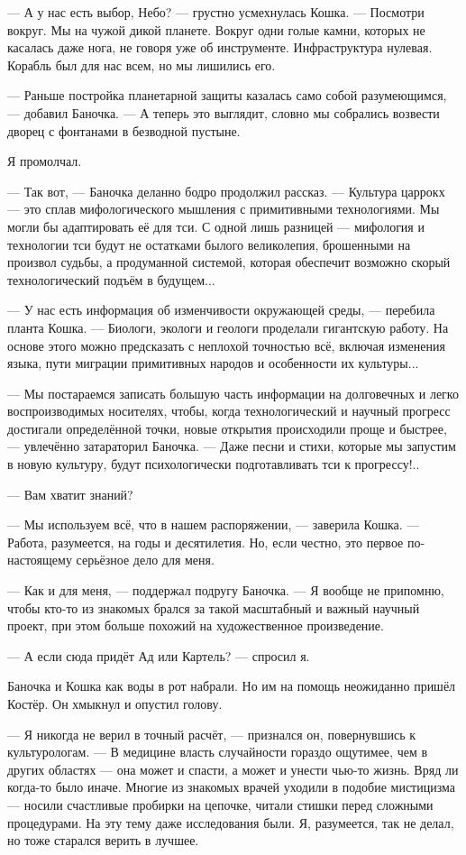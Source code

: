 --- А у нас есть выбор, Небо? --- грустно усмехнулась Кошка.
--- Посмотри вокруг.
Мы на чужой дикой планете.
Вокруг одни голые камни, которых не касалась даже нога, не говоря уже об инструменте.
Инфраструктура нулевая.
Корабль был для нас всем, но мы лишились его.

--- Раньше постройка планетарной защиты казалась само собой разумеющимся, --- добавил Баночка.
--- А теперь это выглядит, словно мы собрались возвести дворец с фонтанами в безводной пустыне.

Я промолчал.

--- Так вот, --- Баночка деланно бодро продолжил рассказ.
--- Культура царрокх --- это сплав мифологического мышления с примитивными технологиями.
Мы могли бы адаптировать её для тси.
С одной лишь разницей --- мифология и технологии тси будут не остатками былого великолепия, брошенными на произвол судьбы, а продуманной системой, которая обеспечит возможно скорый технологический подъём в будущем...

--- У нас есть информация об изменчивости окружающей среды, --- перебила планта Кошка.
--- Биологи, экологи и геологи проделали гигантскую работу.
На основе этого можно предсказать с неплохой точностью всё, включая изменения языка, пути миграции примитивных народов и особенности их культуры...

--- Мы постараемся записать большую часть информации на долговечных и легко воспроизводимых носителях, чтобы, когда технологический и научный прогресс достигали определённой точки, новые открытия происходили проще и быстрее, --- увлечённо затараторил Баночка.
--- Даже песни и стихи, которые мы запустим в новую культуру, будут психологически подготавливать тси к прогрессу!..

--- Вам хватит знаний?

--- Мы используем всё, что в нашем распоряжении, --- заверила Кошка.
--- Работа, разумеется, на годы и десятилетия.
Но, если честно, это первое по-настоящему серьёзное дело для меня.

--- Как и для меня, --- поддержал подругу Баночка.
--- Я вообще не припомню, чтобы кто-то из знакомых брался за такой масштабный и важный научный проект, при этом больше похожий на художественное произведение.

--- А если сюда придёт Ад или Картель? --- спросил я.

Баночка и Кошка как воды в рот набрали.
Но им на помощь неожиданно пришёл Костёр.
Он хмыкнул и опустил голову.

--- Я никогда не верил в точный расчёт, --- признался он, повернувшись к культурологам.
--- В медицине власть случайности гораздо ощутимее, чем в других областях --- она может и спасти, а может и унести чью-то жизнь.
Вряд ли когда-то было иначе.
Многие из знакомых врачей уходили в подобие мистицизма --- носили счастливые пробирки на цепочке, читали стишки перед сложными процедурами.
На эту тему даже исследования были.
Я, разумеется, так не делал, но тоже старался верить в лучшее.


